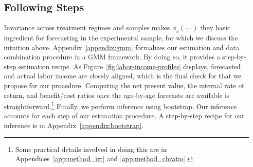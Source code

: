 \subsection{Following Steps}

\noindent Invariance across treatment regimes and samples makes $\phi_{a} (\cdot, \cdot)$ they basic ingredient for forecasting in the experimental sample, for which we discuss the intuition above. Appendix~\ref{appendix:gmm} formalizes our estimation and data combination procedure in a GMM framework. By doing so, it provides a step-by-step estimation recipe. As Figure~\ref{fig:labor-income-profiles} displays, forecasted and actual labor income are closely aligned, which is the final check for that we propose for our procedure. Computing the net present value, the internal rate of return, and benefit/cost ratios once the age-by-age forecasts are available is straightforward.\footnote{Some practical details involved in doing this are in Appendices~\ref{app:method_irr} and \ref{app:method_cbratio}.} Finally, we perform inference using bootstrap. Our inference accounts for each step of our estimation procedure. A step-by-step recipe for our inference is in Appendix~\ref{appendix:bootstrap}. 

